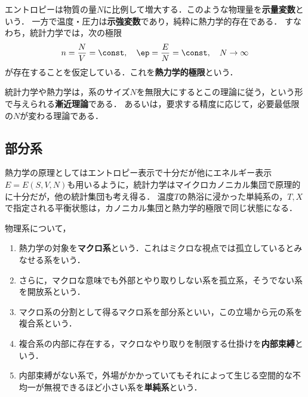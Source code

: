 \documentclass[uplatex,dvipdfmx]{jsreport}
\begin{document}
\begin{example}
    エントロピーは物質の量$N$に比例して増大する．このような物理量を\textbf{示量変数}という．
    一方で温度・圧力は\textbf{示強変数}であり，純粋に熱力学的存在である．
    すなわち，統計力学では，次の極限
    \[n=\frac{N}{V}=\const,\quad \ep=\frac{E}{N}=\const,\quad N\to\infty\]
    が存在することを仮定している．これを\textbf{熱力学的極限}という．
\end{example}
\begin{remarks}
    統計力学や熱力学は，系のサイズ$N$を無限大にするとこの理論に従う，という形で与えられる\textbf{漸近理論}である．
    あるいは，要求する精度に応じて，必要最低限の$N$が変わる理論である．
\end{remarks}

\subsection{部分系}

\begin{tcolorbox}[colframe=ForestGreen, colback=ForestGreen!10!white,breakable,colbacktitle=ForestGreen!40!white,coltitle=black,fonttitle=\bfseries\sffamily,
title=]
    熱力学の原理としてはエントロピー表示で十分だが他にエネルギー表示$E=E(S,V,N)$も用いるように，統計力学はマイクロカノニカル集団で原理的に十分だが，他の統計集団も考え得る．
    温度$T$の熱浴に浸かった単純系の，$T,X$で指定される平衡状態は，カノニカル集団と熱力学的極限で同じ状態になる．
\end{tcolorbox}

\begin{definition}
    物理系について，
    \begin{enumerate}
        \item 熱力学の対象を\textbf{マクロ系}という．これはミクロな視点では孤立しているとみなせる系をいう．
        \item さらに，マクロな意味でも外部とやり取りしない系を孤立系，そうでない系を開放系という．
        \item マクロ系の分割として得るマクロ系を部分系といい，この立場から元の系を複合系という．
        \item 複合系の内部に存在する，マクロなやり取りを制限する仕掛けを\textbf{内部束縛}という．
        \item 内部束縛がない系で，外場がかかっていてもそれによって生じる空間的な不均一が無視できるほど小さい系を\textbf{単純系}という．
    \end{enumerate}
\end{definition}
\end{document}

